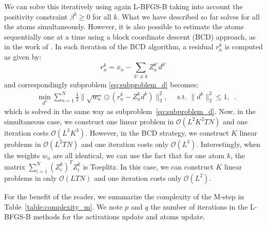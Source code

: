 We can solve this iteratively using again L-BFGS-B taking into account the positivity constraint $\beta^k \geq 0$ for all $k$.
What we have described so far solves for all the atoms simultaneously. However, it is also possible to estimate the atoms sequentially one at a time using a block coordinate descent (BCD) approach, as in the work of \citep{mairal2010online}. In each iteration of the BCD algorithm, a residual $r_n^k$ is computed as given by:
%
\begin{equation}
r_n^k = x_n - \sum_{k'\neq k} Z^{k'}_{n}d^{k'}
\end{equation}
%
and correspondingly subproblem \ref{eq:subproblem_d} becomes:
%
\begin{align}
& \min_{d^k} \sum_{n=1}^{N} \frac{1}{2}\|\sqrt{w_n} \odot (r^k_{n} - Z^k_{n}d^k)\|_{2}^{2}, \quad \text{  s.t.  } \|d^k\|_2^2 \leq 1, \enspace.
\label{eq:subproblem_d_block}
\end{align}
%
which is solved in the same way as subproblem~\ref{eq:subproblem_d}. Now, in the simultaneous case, we construct one linear problem in $\mathcal{O}(L^2K^2TN)$ and one iteration costs $\mathcal{O}(L^3K^3)$. However, in the BCD strategy, we construct $K$ linear problems in $\mathcal{O}(L^2TN)$ and one iteration costs only $\mathcal{O}(L^3)$.
Interestingly, when the weights $w_n$ are all identical, we can 
use the fact that for one atom $k$, the matrix $\sum_{i=1}^{N}(Z_i^k)^T Z_i^k$ is Toeplitz. In this case, we can construct $K$ linear problems in only $\mathcal{O}(LTN)$ and one iteration costs only $\mathcal{O}(L^2)$.

For the benefit of the reader, we summarize the complexity of the M-step in Table~\ref{table:complexity_m}. We note $p$ and $q$ the number of iterations in the L-BFGS-B methods for the activations update and atoms update.


